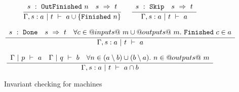 \begin{figure*}
$$
\frac {\displaystyle 
    \begin{array}{lr}
        s ~:~ \mathtt{OutFinished}~n    &
        s ~\Rightarrow~ t
    \end{array}
} {\displaystyle  
     \Gamma, s : a  ~|~  t  ~\vdash~  a \cup \{ \mathtt{Finished}~n \} 
} \ 
\quad
\frac {\displaystyle 
    \begin{array}{lr}
        s ~:~ \mathtt{Skip}    &
        s ~\Rightarrow~ t
    \end{array}
} {\displaystyle  
     \Gamma, s : a  ~|~  t  ~\vdash~  a 
} \ 
$$

$$
\frac {\displaystyle 
    \begin{array}{lcr}
        s ~:~ \mathtt{Done}    &
        s ~\Rightarrow~ t                &
        \forall c \in @inputs@~m \cup @outputs@~m.~ \mathtt{Finished}~c \in a
    \end{array}
} {\displaystyle  
     \Gamma, s : a  ~|~  t  ~\vdash~  a 
} \ 
$$

$$
\frac {\displaystyle 
    \begin{array}{lcr}
        \Gamma ~|~ p ~\vdash~ a      &
        \Gamma ~|~ q ~\vdash~ b      &
        \forall n \in (a \setminus b) \cup (b \setminus a).~ n \in @outputs@~m
    \end{array}
} {\displaystyle  
     \Gamma, s : a  ~|~  t  ~\vdash~  a \cap b 
} \ 
$$


\caption{Invariant checking for machines}
\label{fig:invariants}
\end{figure*}

